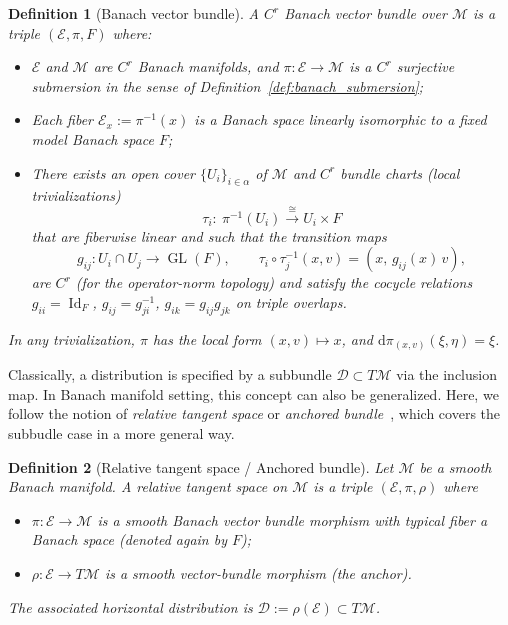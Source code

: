 \documentclass[12pt]{amsart}
\numberwithin{equation}{section}
\newtheorem{definition}{Definition}[section]
\theoremstyle{remark}
\newcommand{\ql}[1]{\texttt{\color{cyan} QL: \footnotesize #1}}
\begin{document}
\begin{definition}[Banach vector bundle]
A $C^r$ Banach vector bundle over $\mathcal M$ is a triple $(\mathcal E,\pi,F)$ where:
\begin{itemize}
\item $\mathcal E$ and $\mathcal M$ are $C^r$ Banach manifolds, and $\pi:\mathcal E\to\mathcal M$ is a $C^r$ surjective submersion in the sense of Definition~\ref{def:banach_submersion};
\item Each fiber $\mathcal E_x:=\pi^{-1}(x)$ is a Banach space linearly isomorphic to a fixed model Banach space $F$;
\item There exists an open cover $\{U_i\}_{i\in \alpha}$ of $\mathcal M$ and $C^r$ bundle charts (local trivializations)
\begin{equation}
\tau_i:\ \pi^{-1}(U_i)\xrightarrow{\ \cong\ } U_i\times F
\end{equation}
that are fiberwise linear and such that the \emph{transition maps}
\begin{equation}
g_{ij}:U_i\cap U_j\to \operatorname{GL}(F),\qquad
\tau_i\circ\tau_j^{-1}(x,v)=(x,\,g_{ij}(x)\,v),
\end{equation}
are $C^r$ (for the operator-norm topology) and satisfy the cocycle relations
$g_{ii}=\operatorname{Id}_F$, $g_{ij}=g_{ji}^{-1}$, $g_{ik}=g_{ij}g_{jk}$ on triple overlaps.
\end{itemize}
In any trivialization, $\pi$ has the local form $(x,v)\mapsto x$, and $\mathrm d\pi_{(x,v)}(\xi,\eta)=\xi$.
\end{definition}

Classically, a distribution is specified by a subbundle $\mathcal D\subset T\mathcal M$ via the inclusion map.
In Banach manifold setting, this concept can also be generalized. Here, we follow the notion of \emph{relative tangent space} or \emph{anchored bundle}~\cite{arguillere2020sub}, which covers the subbudle case in a more general way.

\begin{definition}[Relative tangent space / Anchored bundle]\label{def:relative_tangent_space}
Let $\mathcal M$ be a smooth Banach manifold. A \emph{relative tangent space} on $\mathcal M$ is a triple $(\mathcal E,\pi,\rho)$ where
\begin{itemize}
    \item $\pi:\mathcal E\to \mathcal M$ is a smooth Banach vector bundle morphism with typical fiber a Banach space (denoted again by $F$);
    \item $\rho:\mathcal E\to T\mathcal M$ is a smooth vector-bundle morphism (the \emph{anchor}).
\end{itemize}
The associated horizontal distribution is $\mathcal D:=\rho(\mathcal E)\subset T\mathcal M$.
\end{definition}
\end{document}
